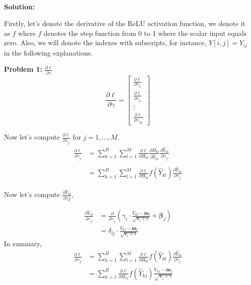 \documentclass{article}
\newenvironment{solution}
  {\par\noindent\textbf{Solution:}\par}
  {\par}
\begin{document}
\subsection{}
\begin{solution}
  Firstly, let's denote the derivative of the ReLU activation function, we denote it as $f$ where $f$ denotes the step function from 0 to 1 where the scalar input equals zero. 
  Also, we will denote the indexes with subscripts, for instance, $Y[i,j]=Y_{ij}$ in the following explanations.

  \textbf{Problem 1:} $\frac{\partial \ell}{\partial \gamma}$
  $$\frac{\partial \ell}{\partial \gamma} = \begin{bmatrix}  \frac{\partial \ell}{\partial \gamma_1} \\ \frac{\partial \ell}{\partial \gamma_2} \\ \vdots \\ \frac{\partial \ell}{\partial \gamma_M}   \end{bmatrix}$$

  Now let's compute $\frac{\partial \ell}{\partial \gamma_j} $ for $ j = 1, \dots, M$.
  \[ 
  \begin{aligned}
    \frac{\partial \ell}{\partial \gamma_j} &= \sum_{k = 1}^{B} \sum_{l = 1}^{M} \frac{\partial \ell}{\partial H_{kl}}\frac{\partial H_{kl}}{\partial \hat{Y}_{kl}}\frac{\partial \hat{Y}_{kl}}{\partial \gamma_j}  \\
                                         \\ &=\sum_{k = 1}^{B} \sum_{l = 1}^{M} \frac{\partial \ell}{\partial H_{kl}}f(\hat{Y}_{kl})\frac{\partial \hat{Y}_{kl}}{\partial \gamma_j}
  \end{aligned}
  \]

  Now let's compute $\frac{\partial \hat{Y}_{kl}}{\partial \gamma{j}}$,

  \[ 
  \begin{aligned} 
    \frac{\partial \hat{Y}_{kl}}{\partial \gamma_j} &= \frac{\partial}{\partial \gamma_j} \left( \gamma_l \cdot \frac{ Y_{kl} - \textbf{m}_l }{\sqrt{\textbf{v}_l + \epsilon}} + \boldsymbol{\beta}_j \right) \\ 
                                                     &=  \delta_{lj} \cdot \frac{ Y_{kl} - \textbf{m}_l }{\sqrt{\textbf{v}_l + \epsilon}}
  \end{aligned}
  \]
  In summary,
  \[
    \begin{aligned}
      \frac{\partial \ell}{\partial \gamma_j} &=\sum_{k = 1}^{B} \sum_{l = 1}^{M} \frac{\partial \ell}{\partial H_{kl}}f(\hat{Y}_{kl})\frac{\partial \hat{Y}_{kl}}{\partial \gamma_j} \\ 
                                              &=\sum_{k=1}^B \frac{\partial \ell}{\partial H_{kj}} f(\hat{Y}_{kj})\frac{Y_{kj} - \textbf{m}_j}{\sqrt{\textbf{v}_j + \epsilon}} 
    \end{aligned}
  \]



\end{solution}
\end{document}
